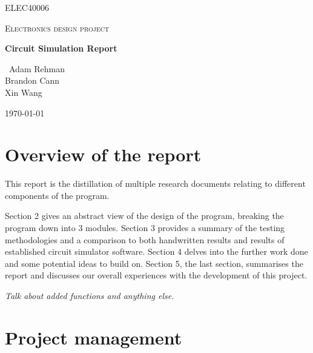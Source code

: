 \documentclass[12pt,a4paper]{article}
\begin{document}
\begin{titlepage}
	\centering
	{\scshape\LARGE ELEC40006 \par}
	\vspace{1cm}
	{\scshape\Large Electronics design project\par}
	\vspace{1.5cm}
	{\huge\bfseries Circuit Simulation Report\par}
	\vspace{2cm}
	{\Large\ Adam Rehman\\ Brandon Cann\\ Xin Wang \par}
	\vfill
	{\large \today\par}
\end{titlepage}

\tableofcontents
\pagebreak

\begin{abstract}
This report describes the design and implementation of a program that is capable of performing a transient simulation
by calculating the node voltages at each successive instant in time. This program parses the netlist file
into a graph data structure, performs analysis using conductance matrices and outputs the results in a CSV format.

-- How accurate is it?
\par
-- Comaparison to commercial software?
\end{abstract}
\pagebreak

\section{Overview of the report}
This report is the distillation of multiple research documents relating to different components of the program. \par
Section 2 gives an abstract view of the design of the program, breaking the program down into 3 modules.
Section 3 provides a summary of the testing methodologies and a comparison to both handwritten results and results of 
established circuit simulator software. 
Section 4 delves into the further work done and some potential ideas to build on.
Section 5, the last section, summarises the report and discusses our overall experiences with the development of this project.
\par
\textit{Talk about added functions and anything else.}
\pagebreak

\section{Project management}
\pagebreak
\end{document}
